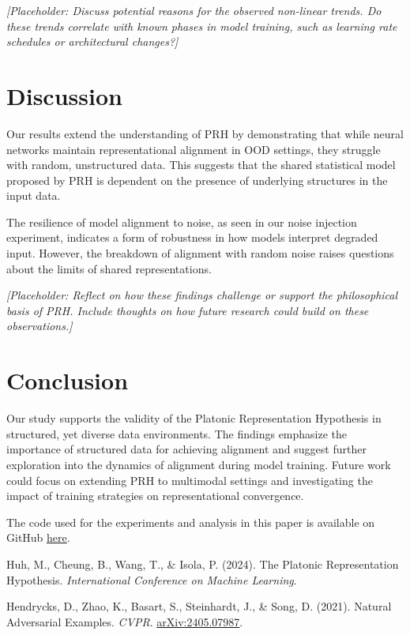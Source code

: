 \documentclass[10pt,a4paper]{article}
\begin{document}
\textit{[Placeholder: Discuss potential reasons for the observed non-linear trends. Do these trends correlate with known phases in model training, such as learning rate schedules or architectural changes?]}

\section{Discussion}
Our results extend the understanding of PRH by demonstrating that while neural networks maintain representational alignment in OOD settings, they struggle with random, unstructured data. This suggests that the shared statistical model proposed by PRH is dependent on the presence of underlying structures in the input data.

The resilience of model alignment to noise, as seen in our noise injection experiment, indicates a form of robustness in how models interpret degraded input. However, the breakdown of alignment with random noise raises questions about the limits of shared representations.

\textit{[Placeholder: Reflect on how these findings challenge or support the philosophical basis of PRH. Include thoughts on how future research could build on these observations.]}

\section{Conclusion}
Our study supports the validity of the Platonic Representation Hypothesis in structured, yet diverse data environments. The findings emphasize the importance of structured data for achieving alignment and suggest further exploration into the dynamics of alignment during model training. Future work could focus on extending PRH to multimodal settings and investigating the impact of training strategies on representational convergence.

\vfill
The code used for the experiments and analysis in this paper is available on GitHub \href{https://github.com/rokosbasilisk/prh-experiments}{here}.

\clearpage
\begin{thebibliography}{9}

Huh, M., Cheung, B., Wang, T., \& Isola, P. (2024). The Platonic Representation Hypothesis. \emph{International Conference on Machine Learning}.

Hendrycks, D., Zhao, K., Basart, S., Steinhardt, J., \& Song, D. (2021). Natural Adversarial Examples. \emph{CVPR}. \href{https://arxiv.org/abs/2405.07987}{arXiv:2405.07987}.

\end{thebibliography}
\end{document}
